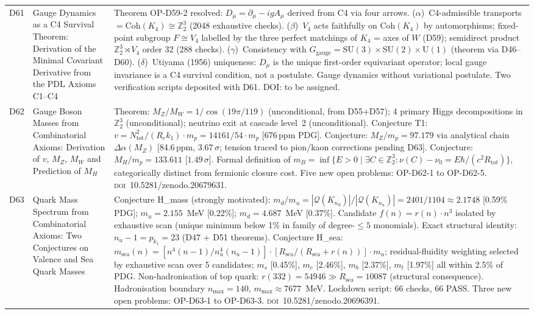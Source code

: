 \documentclass[11pt,a4paper]{article}
\theoremstyle{plain}
\theoremstyle{definition}
\theoremstyle{remark}
\begin{document}
\begin{longtable}{L{1.3cm}L{3.8cm}L{8.0cm}}
D61 & Gauge Dynamics as a C4 Survival Theorem: Derivation of the Minimal Covariant Derivative from the PDL Axioms C1--C4~\cite{D61} & \textcolor{proofblue}{Theorem} OP-D59-2 resolved: $D_\mu = \partial_\mu - igA_\mu$ derived from C4 via four arrows. ($\alpha$)~C4-admissible transports $= \mathrm{Coh}(K_4) \cong \mathbb{Z}_2^3$ (2048 exhaustive checks). ($\beta$)~$V_4$ acts faithfully on $\mathrm{Coh}(K_4)$ by automorphisms; fixed-point subgroup $F \cong V_4$ labelled by the three perfect matchings of $K_4$ = axes of $W$ (D59); semidirect product $\mathbb{Z}_2^3\rtimes V_4$ order 32 (288 checks). ($\gamma$)~Consistency with $G_{\mathrm{gauge}} = \mathrm{SU}(3)\times\mathrm{SU}(2)\times\mathrm{U}(1)$ (theorem via D46--D60). ($\delta$)~Utiyama (1956) uniqueness: $D_\mu$ is the unique first-order equivariant operator; local gauge invariance is a C4 survival condition, not a postulate. Gauge dynamics without variational postulate. Two verification scripts deposited with D61. DOI: to be assigned.\\[0.4em]
D62 & Gauge Boson Masses from Combinatorial Axioms: Derivation of $v$, $M_Z$, $M_W$ and Prediction of $M_H$~\cite{D62} & \textcolor{proofblue}{Theorem}: $M_Z/M_W = 1/\cos(19\pi/119)$ (unconditional, from D55+D57); 4 primary Higgs decompositions in $\mathbb{Z}_2^3$ (unconditional); neutrino exit at cascade level~2 (unconditional). \textcolor{conjecturegreen}{Conjecture T1}: $v = N_{\mathrm{tot}}^2/(R_e k_1)\cdot m_p = 14161/54\cdot m_p$ [676\,ppm PDG]. \textcolor{conjecturegreen}{Conjecture}: $M_Z/m_p = 97.179$ via analytical chain $\Delta\alpha(M_Z)$ [84.6\,ppm, $3.67\,\sigma$; tension traced to pion/kaon corrections pending D63]. \textcolor{conjecturegreen}{Conjecture}: $M_H/m_p = 133.611$ [$1.49\,\sigma$]. Formal definition of $m_B = \inf\{E>0 \mid \exists C\in\mathbb{Z}_2^3: \nu(C)-\nu_0 = E\hbar/(c^2 R_{\mathrm{tot}})\}$, categorically distinct from fermionic closure cost. Five new open problems: OP-D62-1 to OP-D62-5. \textsc{doi}~10.5281/zenodo.20679631.\\[0.4em]
D63 & Quark Mass Spectrum from Combinatorial Axioms: Two Conjectures on Valence and Sea Quark Masses~\cite{D63} & \textcolor{conjecturegreen}{Conjecture H\_mass} (strongly motivated): $m_d/m_u = |\mathcal{Q}(K_{n_d})|/|\mathcal{Q}(K_{n_u})| = 2401/1104 \approx 2.1748$ [0.59\% PDG]; $m_u = 2.155$~MeV [0.22\%]; $m_d = 4.687$~MeV [0.37\%]. Candidate $f(n)=r(n)\cdot n^3$ isolated by exhaustive scan (unique minimum below 1\% in family of degree-$\leq 5$ monomials). Exact structural identity: $n_u - 1 = p_{k_1} = 23$ (D47 + D51 theorems). \textcolor{conjecturegreen}{Conjecture H\_sea}: $m_{\mathrm{sea}}(n) = [n^4(n-1)/n_u^4(n_u-1)]\cdot[R_{\mathrm{sea}}/(R_{\mathrm{sea}}+r(n))]\cdot m_u$; residual-fluidity weighting selected by exhaustive scan over 5 candidates; $m_s$ [0.45\%], $m_c$ [2.46\%], $m_b$ [2.37\%], $m_t$ [1.97\%] all within 2.5\% of PDG. Non-hadronisation of top quark: $r(332)=54946 \gg R_{\mathrm{sea}}=10087$ (structural consequence). Hadronisation boundary $n_{\max}=140$, $m_{\max}\approx7677$~MeV. Lockdown script: 66 checks, 66 PASS. Three new open problems: OP-D63-1 to OP-D63-3. \textsc{doi}~10.5281/zenodo.20696391.\\[0.4em]

\end{longtable}
\end{document}
